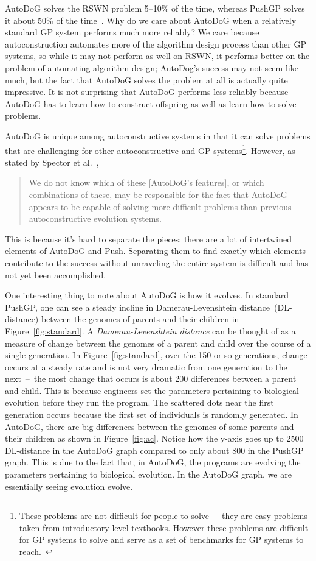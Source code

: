 \documentclass{sig-alternate}
\begin{document}
AutoDoG solves the RSWN problem 5--10\% of the time, whereas PushGP solves it about 50\% of the time~\cite{helmuth:2015}. Why do we care about AutoDoG when a relatively standard GP system performs much more reliably? We care because autoconstruction automates more of the algorithm design process than other GP systems, so while it may not perform as well on RSWN, it performs better on the problem of automating algorithm design; AutoDog's success may not seem like much, but the fact that AutoDoG solves the problem at all is actually quite impressive. It is not surprising that AutoDoG performs less reliably because AutoDoG has to learn how to construct offspring as well as learn how to solve problems.

AutoDoG is unique among autoconstructive systems in that it can solve problems that are challenging for other autoconstructive and GP systems\footnote{These problems are not difficult for people to solve~--~they are easy problems taken from introductory level textbooks. However these problems are difficult for GP systems to solve and serve as a set of benchmarks for GP systems to reach.~\cite{helmuth:2015}}. However, as stated by Spector et al.~\cite{spector:2016},
\begin{quotation}
	We do not know which of these [AutoDoG's features], or which combinations of these, may be responsible for the fact that AutoDoG appears to be capable of solving more difficult problems than previous autoconstructive evolution systems.
\end{quotation}
This is because it's hard to separate the pieces; there are a lot of intertwined elements of AutoDoG and Push. Separating them to find exactly which elements contribute to the success without unraveling the entire system is difficult and has not yet been accomplished.

One interesting thing to note about AutoDoG is how it evolves. In standard PushGP, one can see a steady incline in Damerau-Levenshtein distance~(DL-distance) between the genomes of parents and their children in Figure~\ref{fig:standard}. A \textit{Damerau-Levenshtein distance} can be thought of as a measure of change between the genomes of a parent and child over the course of a single generation. In Figure~\ref{fig:standard}, over the 150 or so generations, change occurs at a steady rate and is not very dramatic from one generation to the next~--~the most change that occurs is about 200 differences between a parent and child. This is because engineers set the parameters pertaining to biological evolution before they run the program. The scattered dots near the first generation occurs because the first set of individuals is randomly generated. In AutoDoG, there are big differences between the genomes of some parents and their children as shown in Figure~\ref{fig:ac}. Notice how the y-axis goes up to 2500 DL-distance in the AutoDoG graph compared to only about 800 in the PushGP graph. This is due to the fact that, in AutoDoG, the programs are evolving the parameters pertaining to biological evolution. In the AutoDoG graph, we are essentially seeing evolution evolve.
\end{document}
